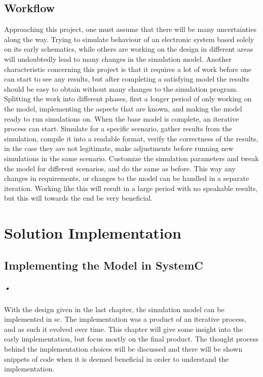 \documentclass[a4paper, 12pt]{report}
\begin{document}
\section{Workflow}
Approaching this project, one must assume that there will be many uncertainties along the way.
Trying to simulate behaviour of an electronic system based solely on its early schematics, while others are working on the design in different areas will undoubtedly lead to many changes in the simulation model.
Another characteristic concerning this project is that it requires a lot of work before one can start to see any results, but after completing a satisfying  model the results should be easy to obtain without many changes to the simulation program.
Splitting the work into different phases, first a longer period of only working on the model, implementing the aspects that are known, and making the model ready to run simulations on.
When the base model is complete, an iterative process can start.
Simulate for a specific scenario, gather results from the simulation, compile it into a readable format, verify the correctness of the results, in the case they are not legitimate, make adjustments before running new simulations in the same scenario.
Customize the simulation parameters and tweak the model for different scenarios, and do the same as before.
This way any changes in requirements, or changes to the model can be handled in a separate iteration.
Working like this will result in a large period with no speakable results, but this will towards the end be very beneficial.

\chapter{Solution Implementation}

\section{Implementing the Model in SystemC}

\paragraph{•}
With the design given in the last chapter, the simulation model can be implemented in \gls{sc}.
The implementation was a product of an iterative process, and as such it evolved over time.
This chapter will give some insight into the early implementation, but focus mostly on the final product.
The thought process behind the implementation choices will be discussed and there will be shown snippets of code when it is deemed beneficial in order to understand the implementation.
\end{document}
